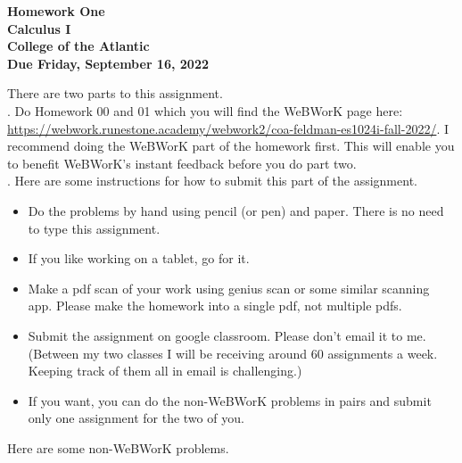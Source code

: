 \documentclass[12pt]{article}
\begin{document}
\pagestyle{empty}
 
\begin{center}
{\LARGE {\bf Homework One}}\\
\bigskip
{\Large {\bf Calculus I}}\\
\bigskip
{\Large {\bf College of the Atlantic}}\\
\bigskip
{ {\bf Due Friday, September 16, 2022}}\\ 
\end{center}
\medskip


\noindent There are two parts to this assignment.\\

.  Do Homework 00 and 01 which you
will find the WeBWorK page here:
\url{https://webwork.runestone.academy/webwork2/coa-feldman-es1024i-fall-2022/}.
I recommend doing the WeBWorK part of the homework first.  This will
enable you to benefit WeBWorK's instant feedback before you do part
two.\\ 


.  Here are some
instructions for how to submit this part of the assignment.
\begin{itemize}
\item Do the problems by hand using pencil (or pen) and paper.
  There is no need to type this assignment.
\item If you like working on a tablet, go for it. 
\item Make a pdf scan of your work using genius scan or some
  similar scanning app.  Please make the homework into a single
  pdf, not multiple pdfs.
\item Submit the assignment on google classroom.  Please don't
  email it to me.  (Between my two classes I will be receiving
  around 60 assignments a week.  Keeping track of them all in email 
  is challenging.)
\item If you want, you can do the non-WeBWorK problems in pairs and
  submit only one assignment for the two of you. \\
\end{itemize}

\noindent Here are some non-WeBWorK problems.
\end{document}
